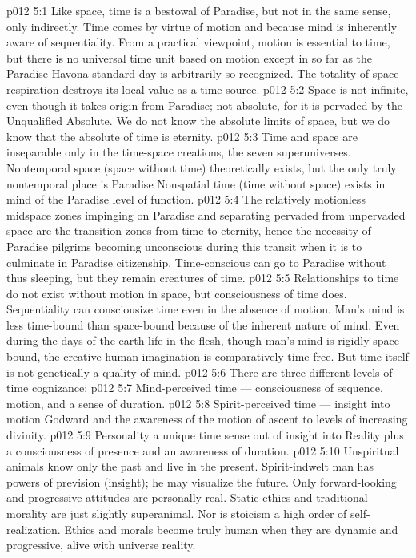 \vs p012 5:1 Like space, time is a bestowal of Paradise, but not in the same sense, only indirectly. Time comes by virtue of motion and because mind is inherently aware of sequentiality. From a practical viewpoint, motion is essential to time, but there is no universal time unit based on motion except in so far as the Paradise\hyp{}Havona standard day is arbitrarily so recognized. The totality of space respiration destroys its local value as a time source.
\vs p012 5:2 Space is not infinite, even though it takes origin from Paradise; not absolute, for it is pervaded by the Unqualified Absolute. We do not know the absolute limits of space, but we do know that the absolute of time is eternity.
\vs p012 5:3 \pc Time and space are inseparable only in the time\hyp{}space creations, the seven superuniverses. Nontemporal space (space without time) theoretically exists, but the only truly nontemporal place is Paradise  Nonspatial time (time without space) exists in mind of the Paradise level of function.
\vs p012 5:4 The relatively motionless midspace zones impinging on Paradise and separating pervaded from unpervaded space are the transition zones from time to eternity, hence the necessity of Paradise pilgrims becoming unconscious during this transit when it is to culminate in Paradise citizenship. Time\hyp{}conscious  can go to Paradise without thus sleeping, but they remain creatures of time.
\vs p012 5:5 \pc Relationships to time do not exist without motion in space, but consciousness of time does. Sequentiality can consciousize time even in the absence of motion. Man’s mind is less time\hyp{}bound than space\hyp{}bound because of the inherent nature of mind. Even during the days of the earth life in the flesh, though man’s mind is rigidly space\hyp{}bound, the creative human imagination is comparatively time free. But time itself is not genetically a quality of mind.
\vs p012 5:6 \pc There are three different levels of time cognizance:
\vs p012 5:7 \bibnobreakspace Mind\hyp{}perceived time --- consciousness of sequence, motion, and a sense of duration.
\vs p012 5:8 \bibnobreakspace Spirit\hyp{}perceived time --- insight into motion Godward and the awareness of the motion of ascent to levels of increasing divinity.
\vs p012 5:9 \bibnobreakspace Personality  a unique time sense out of insight into Reality plus a consciousness of presence and an awareness of duration.
\vs p012 5:10 \pc Unspiritual animals know only the past and live in the present. Spirit\hyp{}indwelt man has powers of prevision (insight); he may visualize the future. Only forward\hyp{}looking and progressive attitudes are personally real. Static ethics and traditional morality are just slightly superanimal. Nor is stoicism a high order of self\hyp{}realization. Ethics and morals become truly human when they are dynamic and progressive, alive with universe reality.

